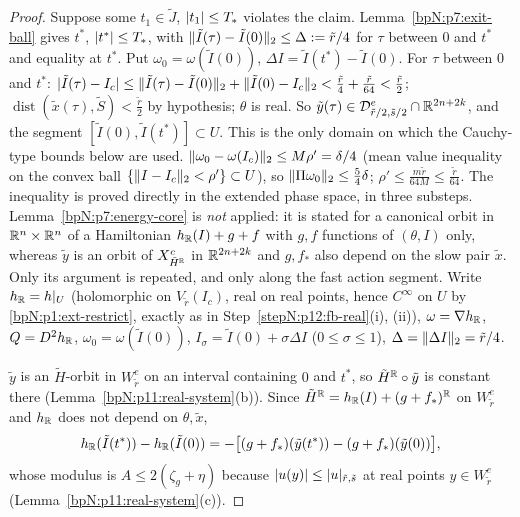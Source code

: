 \begin{proof}
Suppose some $t_1\in\tilde J$, $\lvert t_1\rvert\le T_*$ violates the claim. Lemma~\ref{bpN:p7:exit-ball} gives $t^*$, $\lvert t^*\rvert\le T_*$, with $\lVert \tilde I(\tau)-\tilde I(0)\rVert_2\le\Delta:=\tilde r/4$ for $\tau$ between $0$ and $t^*$ and equality at $t^*$. Put $\omega_0=\omega(\tilde I(0))$, $\Delta I=\tilde I(t^*)-\tilde I(0)$.
\label{stepN:p11:ef-tube} For $\tau$ between $0$ and $t^*$: $\lvert \tilde I(\tau)-I_c\rvert\le\lVert \tilde I(\tau)-\tilde I(0)\rVert_2+\lVert \tilde I(0)-I_c\rVert_2<\frac{\tilde r}4+\frac{\tilde r}{64}<\frac{\tilde r}2$; $\operatorname{dist}(\tilde x(\tau),\tilde S)<\frac{\tilde r}2$ by hypothesis; $\theta$ is real. So $\tilde y(\tau)\in\mathcal D_{\tilde r/2,\tilde s/2}^e\cap\mathbb{R}^{2n+2k}$, and the segment $[\tilde I(0),\tilde I(t^*)]\subset U$. This is the only domain on which the Cauchy-type bounds below are used.
\label{stepN:p11:ef-adm} $\lVert \omega_0-\omega(I_c)\rVert_2\le M\rho'=\delta/4$ (mean value inequality on the convex ball $\{\lVert I-I_c\rVert_2<\rho'\}\subset U$), so $\lVert \Pi\omega_0\rVert_2\le\frac54\delta$; $\rho'\le\frac{m\tilde r}{64M}\le\frac{\tilde r}{64}$.
\label{stepN:p11:ef-en} The inequality is proved directly in the extended phase space, in three substeps. Lemma~\ref{bpN:p7:energy-core} is \emph{not} applied: it is stated for a canonical orbit in $\mathbb{R}^n\times\mathbb{R}^n$ of a Hamiltonian $h_{\mathbb{R}}(I)+g+f$ with $g,f$ functions of $(\theta,I)$ only, whereas $\tilde y$ is an orbit of $X^c_{\tilde H^{\mathbb{R}}}$ in $\mathbb{R}^{2n+2k}$ and $g,f_*$ also depend on the slow pair $\tilde x$. Only its argument is repeated, and only along the fast action segment. Write $h_{\mathbb{R}}=h|_U$ (holomorphic on $V_{\tilde r}(I_c)$, real on real points, hence $C^\infty$ on $U$ by \ref{bpN:p1:ext-restrict}, exactly as in Step~\ref{stepN:p12:fb-real}(i), (ii)), $\omega=\nabla h_{\mathbb{R}}$, $Q=D^2h_{\mathbb{R}}$, $\omega_0=\omega(\tilde I(0))$, $I_\sigma=\tilde I(0)+\sigma\Delta I$ ($0\le\sigma\le1$), $\Delta=\lVert \Delta I\rVert_2=\tilde r/4$.

\label{stepN:p11:ef-en-energy} $\tilde y$ is an $\tilde H$-orbit in $W^e_{\tilde r}$ on an interval containing $0$ and $t^*$, so $\tilde H^{\mathbb{R}}\circ\tilde y$ is constant there (Lemma~\ref{bpN:p11:real-system}(b)). Since $\tilde H^{\mathbb{R}}=h_{\mathbb{R}}(I)+(g+f_*)^{\mathbb{R}}$ on $W^e_{\tilde r}$ and $h_{\mathbb{R}}$ does not depend on $\theta,\tilde x$,
\[h_{\mathbb{R}}(\tilde I(t^*))-h_{\mathbb{R}}(\tilde I(0))=-\bigl[(g+f_*)(\tilde y(t^*))-(g+f_*)(\tilde y(0))\bigr],\]
whose modulus is $A\le2(\zeta_g+\eta)$ because $\lvert u(y)\rvert\le\lvert u\rvert_{\tilde r,\tilde s}$ at real points $y\in W^e_{\tilde r}$ (Lemma~\ref{bpN:p11:real-system}(c)).


\end{proof}
